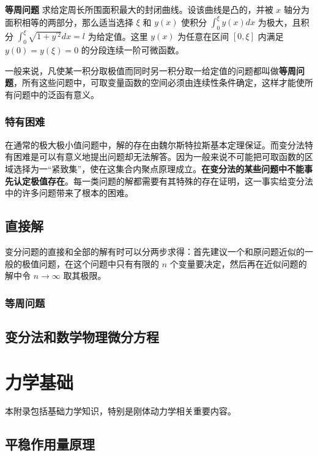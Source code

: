 \documentclass[cn,11pt,chinese,blue,bibstyle=ieeetr]{elegantbook}
\begin{document}
{\begin{example}
	\textbf{等周问题} 求给定周长所围面积最大的封闭曲线。设该曲线是凸的，并被 $x$ 轴分为面积相等的两部分，那么适当选择 $\xi$ 和 $y(x)$ 使积分 $\int_{0}^{\xi}  {y(x)} dx$ 为极大，且积分 $\int_{0}^{\xi} {\sqrt {1 + y^{'2}}} dx = l$ 为给定值。这里 $y(x)$ 为任意在区间 $[0, \xi]$ 内满足 $y(0) = y(\xi) = 0$ 的分段连续一阶可微函数。
\end{example}

一般来说，凡使某一积分取极值而同时另一积分取一给定值的问题都叫做\textbf{等周问题}，所有这些问题中，可取变量函数的空间必须由连续性条件确定，这样才能使所有问题中的泛函有意义。


\subsection{特有困难}

在通常的极大极小值问题中，解的存在由魏尔斯特拉斯基本定理保证。而变分法特有困难是可以有意义地提出问题却无法解答。因为一般来说不可能把可取函数的区域选择为一“紧致集”，使在这集合内聚点原理成立。\textbf{在变分法的某些问题中不能事先认定极值存在}。每一类问题的解都需要有其特殊的存在证明，这一事实给变分法中的许多问题带来了根本的困难。


\section{直接解}

变分问题的直接和全部的解有时可以分两步求得：首先建议一个和原问题近似的一般的极值问题，在这个问题中只有有限的 $n$ 个变量要决定，然后再在近似问题的解中令 $n \to \infty$ 取其极限。

\subsection{等周问题}



\section{变分法和数学物理微分方程}



\chapter{力学基础}


本附录包括基础力学知识，特别是刚体动力学相关重要内容。

\section{平稳作用量原理}

}
\end{document}
